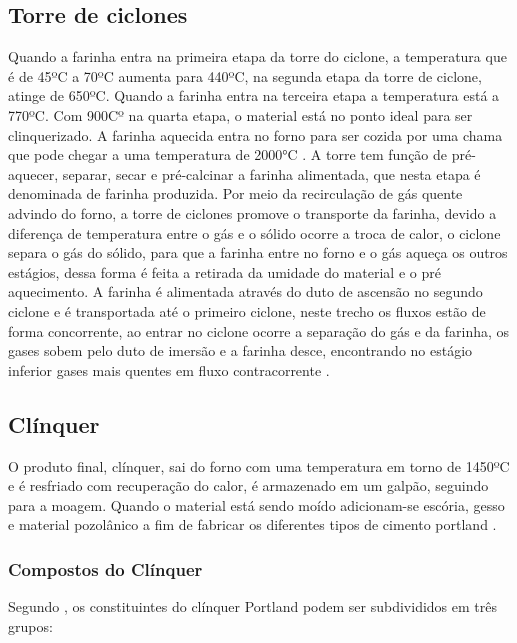  \pagebreak

\subsection{Torre de ciclones}

Quando a farinha entra na primeira etapa da torre do ciclone, a temperatura que é de 45ºC a 70ºC aumenta para 440ºC, na segunda etapa da torre de ciclone, atinge de 650ºC. Quando a farinha entra na terceira etapa a temperatura está a 770ºC. Com 900Cº na quarta etapa, o material está no ponto ideal para ser clinquerizado. A farinha aquecida entra no forno para ser cozida por uma chama que pode chegar a uma temperatura de 2000°C \cite{Andre2011}. A torre tem função de pré-aquecer, separar, secar e pré-calcinar a farinha alimentada, que nesta etapa é denominada de farinha produzida. Por meio da recirculação de gás quente advindo do forno, a torre de ciclones promove o transporte da farinha, devido a diferença de temperatura entre o gás e o sólido ocorre a troca de calor, o ciclone separa o gás do sólido, para que a farinha entre no forno e o gás aqueça os outros estágios, dessa forma é feita a retirada da umidade do material e o pré aquecimento. A farinha é alimentada através do duto de ascensão no segundo ciclone e é transportada até o primeiro ciclone, neste trecho os fluxos estão de forma concorrente, ao entrar no ciclone ocorre a separação do gás e da farinha, os gases sobem pelo duto de imersão e a farinha desce, encontrando no estágio inferior gases mais quentes em fluxo contracorrente \cite{Carvalho2023}.


\subsection{Clínquer}

O produto final, clínquer, sai do forno com uma temperatura em torno de 1450ºC e é resfriado com recuperação do calor, é armazenado em um galpão, seguindo para a moagem. Quando o material está sendo moído adicionam-se escória, gesso e material pozolânico a fim de fabricar os diferentes tipos de cimento portland \cite{Andre2011}.

\subsubsection{Compostos do Clínquer}

Segundo \cite{Gobbo2003}, os constituintes do clínquer Portland podem ser subdivididos em três grupos:

